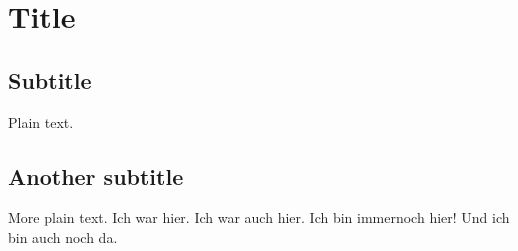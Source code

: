 \documentclass{article}
\begin{document}
\section{Title}

\subsection{Subtitle}

Plain text.

\subsection{Another subtitle}

More plain text.
Ich war hier.
Ich war auch hier.
Ich bin immernoch hier!
Und ich bin auch noch da.
\end{document}
